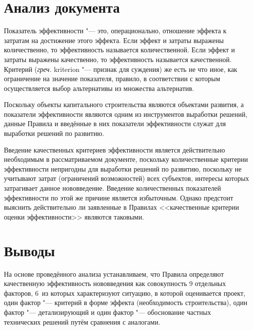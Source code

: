 \documentclass[a4paper, 12pt, numbers=enddot]{scrartcl}
\begin{document}
\section{Анализ документа}
Показатель эффективности "--- это, операционально, отношение эффекта к затратам
на достижение этого эффекта. Если эффект и затраты выражены количественно, то
эффективность называется количественной. Если эффект и затраты выражены
качественно, то эффективность называется качественной. Критерий (\textit{греч.}
kriterion "--- признак для суждения) же есть не что иное, как ограничение на
значение показателя, правило, в соответствии с которым осуществляется выбор
альтернативы из множества альтернатив.

Поскольку объекты капитального строительства являются объектами развития, а
показатели эффективности являются одним из инструментов выработки решений,
данные Правила и введённые в них показатели эффективности служат для выработки
решений по развитию.

Введение качественных критериев эффективности является действительно
необходимым в рассматриваемом документе, поскольку количественные критерии
эффективности непригодны для выработки решений по развитию, поскольку не
учитывают затрат (ограничений возможностей) всех субъектов, интересы которых
затрагивает данное нововведение. Введение количественных показателей
эффективности по этой же причине является избыточным. Однако предстоит выяснить
действительно ли заявленные в Правилах <<качественные критерии оценки
эффективности>> являются таковыми. 

\section{Выводы}
На основе проведённого анализа устанавливаем, что Правила определяют
качественную эффективность нововведения как совокупность 9 отдельных факторов,
6~из которых характеризуют ситуацию, в которой оценивается проект, один фактор
"--- критерий в форме эффекта (необходимость строительства), один фактор "---
детализирующий и один фактор "--- обоснование частных технических решений путём
сравнения с аналогами.
\end{document}
